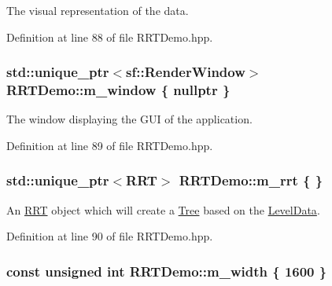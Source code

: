 The visual representation of the data. 



Definition at line 88 of file R\+R\+T\+Demo.\+hpp.

\hypertarget{classRRTDemo_aedde8ecc0fa074bab8c7a4d34c45c0de}{
\subsubsection[{m\+\_\+window}]{\setlength{\rightskip}{0pt plus 5cm}std\+::unique\+\_\+ptr$<$sf\+::\+Render\+Window$>$ R\+R\+T\+Demo\+::m\+\_\+window \{ nullptr \}\hspace{0.3cm}{\ttfamily [private]}}}\label{classRRTDemo_aedde8ecc0fa074bab8c7a4d34c45c0de}


The window displaying the G\+U\+I of the application. 



Definition at line 89 of file R\+R\+T\+Demo.\+hpp.

\hypertarget{classRRTDemo_ae2cc9c4a77e79e09d2b0fa0dcde114c5}{
\subsubsection[{m\+\_\+rrt}]{\setlength{\rightskip}{0pt plus 5cm}std\+::unique\+\_\+ptr$<${\bf R\+R\+T}$>$ R\+R\+T\+Demo\+::m\+\_\+rrt \{ \}\hspace{0.3cm}{\ttfamily [private]}}}\label{classRRTDemo_ae2cc9c4a77e79e09d2b0fa0dcde114c5}


An \hyperlink{classRRT}{R\+R\+T} object which will create a \hyperlink{classTree}{Tree} based on the \hyperlink{classLevelData}{Level\+Data}. 



Definition at line 90 of file R\+R\+T\+Demo.\+hpp.

\hypertarget{classRRTDemo_ae4c5cf25ec52db70003a96ebd0f81c62}{
\subsubsection[{m\+\_\+width}]{\setlength{\rightskip}{0pt plus 5cm}const unsigned int R\+R\+T\+Demo\+::m\+\_\+width \{ 1600 \}\hspace{0.3cm}{\ttfamily [private]}}}\label{classRRTDemo_ae4c5cf25ec52db70003a96ebd0f81c62}


